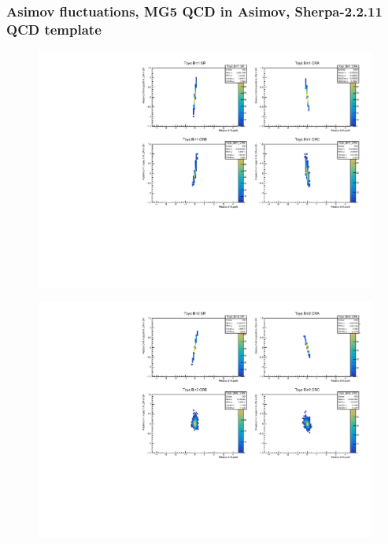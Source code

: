 \subsubsection{\mjj Asimov fluctuations, MG5 QCD in Asimov, Sherpa-2.2.11 QCD template}
\begin{figure}[H]
\includegraphics[width=\textwidth]{plots/diffx/instab/linearfx/instabilities_mjj_QCD_Sh2211_Signal_Sh2211_BSDATASTATS_linearfx_newbinning_madgraphasimov_bin1.pdf}
\end{figure}
\begin{figure}[H]
\includegraphics[width=\textwidth]{plots/diffx/instab/linearfx/instabilities_mjj_QCD_Sh2211_Signal_Sh2211_BSDATASTATS_linearfx_newbinning_madgraphasimov_bin2.pdf}
\end{figure}
